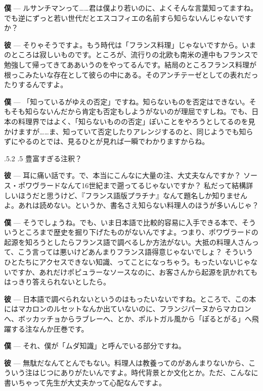 \documentclass[14Q,]{ltjsbook}
\makeatletter
\renewcommand{\headfont}{\gtfamily\sffamily\bfseries}%
\renewcommand{\subsection}{\@startsection{subsection}{2}{\z@}%
    {\Cvs \@plus.5\Cdp \@minus.2\Cdp}%
    {.5\Cvs}
    {\normalfont\large\headfont\centering}} %
\renewcommand{\ldots}{\noindent…}
\makeatother
\begin{document}
\textbf{僕} ---
ルサンチマンって\ldots{}\ldots{}君は僕より若いのに、よくそんな言葉知ってますね。でも逆にずっと若い世代だとエスコフィエの名前すら知らないんじゃないですか？

\textbf{彼} ---
そりゃそうですよ。もう時代は「フランス料理」じゃないですから。いまのところは寂しいものです。ところが、流行りの北欧も南米の連中もフランスで勉強して帰ってきてああいうのをやってるんです。結局のところフランス料理が根っこみたいな存在として彼らの中にある。そのアンチテーゼとしての表れだったりするんですよ。

\textbf{僕} ---
「知っているがゆえの否定」ですね。知らないものを否定はできない。そもそも知らないんだから肯定も否定もしようがないのが理屈ですしね。でも、日本の料理界ではよく、「知らないものの否定」ぽいことをやろうとしてるのを見かけますが\ldots{}\ldots{}ま、知っていて否定したりアレンジするのと、同じようでも知らずにやるのとでは、見るひとが見れば一瞬でわかりますからね。

\hypertarget{notes-abondantes}{%
\subsection{豊富すぎる注釈？}\label{notes-abondantes}}

\textbf{彼} ---
耳に痛い話です。で、本当にこんなに大量の注、大丈夫なんですか？
ソース・ポワヴラードなんて16世紀まで遡ってるじゃないですか？
私だって結構詳しいほうだと思うけど、『フランス語版プラチナ』なんて題名しか知りませんよ。あれは読めない。というか、書名さえ知らない料理人のほうが多いんじゃ？

\textbf{僕} ---
そうでしょうね。でも、いま日本語で比較的容易に入手できる本で、そういうところまで歴史を掘り下げたものがないんですよ。つまり、ポワヴラードの起源を知ろうとしたらフランス語で調べるしか方法がない。大抵の料理人さんって、こう言っては悪いけどあんまりフランス語得意じゃないでしょ？
そういうひとたちにアクセスできない知識、ってことになっちゃう。もったいないじゃないですか、あれだけポピュラーなソースなのに、お客さんから起源を訊かれてもはっきり答えられないとしたら。

\textbf{彼} ---
日本語で調べられないというのはもったいないですね。ところで、この本にはマカロンのルセットなんか出ていないのに、フランジパーヌからマカロンへ、ボッカッチョからラブレーへ、とか、ポルトガル風から「ぽるとがる」へ飛躍する注なんか圧巻です。

\textbf{僕} --- それ、僕が「ムダ知識」と呼んでいる部分ですね。

\textbf{彼} ---
無駄だなんてとんでもない。料理人は教養ってのがあんまりないから、こういう注はじつにありがたいんですよ。時代背景とか文化とか。ただ、こんなに書いちゃって先生が大丈夫かって心配なんですよ。
\end{document}
